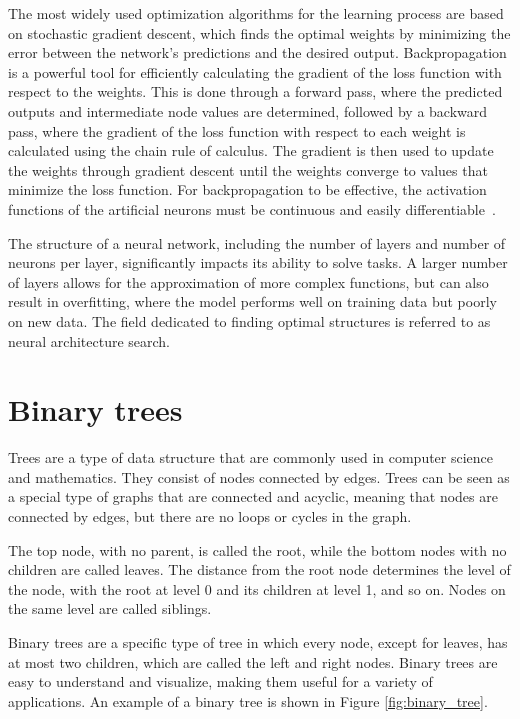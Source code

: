 The most widely used optimization algorithms for the learning process are based on stochastic gradient descent, which finds the optimal weights by minimizing the error between the network's predictions and the desired output. Backpropagation is a powerful tool for efficiently calculating the gradient of the loss function with respect to the weights. This is done through a forward pass, where the predicted outputs and intermediate node values are determined, followed by a backward pass, where the gradient of the loss function with respect to each weight is calculated using the chain rule of calculus. The gradient is then used to update the weights through gradient descent until the weights converge to values that minimize the loss function. For backpropagation to be effective, the activation functions of the artificial neurons must be continuous and easily differentiable~\cite{goodfellow_deep_2016}.

The structure of a neural network, including the number of layers and number of neurons per layer, significantly impacts its ability to solve tasks. A larger number of layers allows for the approximation of more complex functions, but can also result in overfitting, where the model performs well on training data but poorly on new data. The field dedicated to finding optimal structures is referred to as neural architecture search.

\section{Binary trees}

Trees are a type of data structure that are commonly used in computer science and mathematics. They consist of nodes connected by edges. Trees can be seen as a special type of graphs that are connected and acyclic, meaning that nodes are connected by edges, but there are no loops or cycles in the graph.

The top node, with no parent, is called the root, while the bottom nodes with no children are called leaves. The distance from the root node determines the level of the node, with the root at level 0 and its children at level 1, and so on. Nodes on the same level are called siblings.

Binary trees are a specific type of tree in which every node, except for leaves, has at most two children, which are called the left and right nodes. Binary trees are easy to understand and visualize, making them useful for a variety of applications. An example of a binary tree is shown in Figure \ref{fig:binary_tree}.

